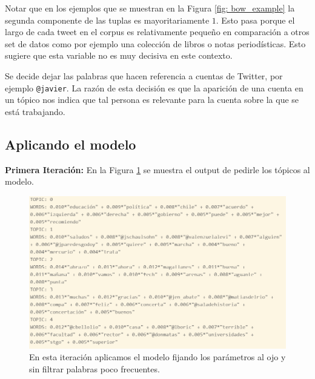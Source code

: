 \documentclass{article}
\begin{document}
	\begin{remark}
		Notar que en los ejemplos que se muestran en la Figura \ref{fig: bow_example} la segunda componente de las tuplas es mayoritariamente $1$. Esto pasa porque el largo de cada tweet en el corpus es relativamente pequeño en comparación a otros set de datos como por ejemplo una colección de libros o notas periodísticas. Esto sugiere que esta variable no es muy decisiva en este contexto. 
	\end{remark}

	\begin{remark}
		Se decide dejar las palabras que hacen referencia a cuentas de Twitter, por ejemplo \texttt{@javier}. La razón de esta decisión es que la aparición de una cuenta en un tópico nos indica que tal persona es relevante para la cuenta sobre la que se está trabajando.
	\end{remark}

	\subsection{Aplicando el modelo}
	
	\textbf{Primera Iteración:} En la Figura \ref{fig: boric0_informe} se muestra el output de pedirle los tópicos al modelo.    
	
		\begin{figure}[H]
		\centering
		\includegraphics[scale=.5]{../imgs/boric0_informe.png}
		\caption{En esta iteración aplicamos el modelo fijando los parámetros al ojo y sin filtrar palabras poco frecuentes.}
		\label{fig: boric0_informe}
	\end{figure}
%
\end{document}
